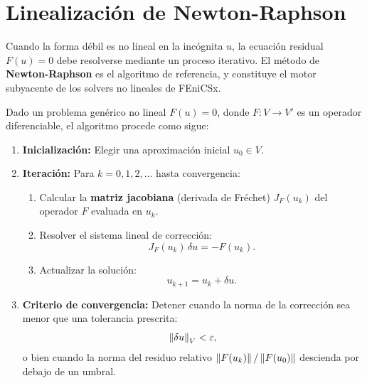 \section{Linealización de Newton-Raphson}
\label{sec:newton-raphson}

Cuando la forma débil es no lineal en la incógnita $u$, la ecuación residual $F(u) = 0$ debe resolverse mediante un proceso iterativo. El método de \textbf{Newton-Raphson} es el algoritmo de referencia, y constituye el motor subyacente de los solvers no lineales de FEniCSx.

Dado un problema genérico no lineal $F(u) = 0$, donde $F: V \to V'$ es un operador diferenciable, el algoritmo procede como sigue:

\begin{enumerate}
    \item \textbf{Inicialización:} Elegir una aproximación inicial $u_0 \in V$.
    \item \textbf{Iteración:} Para $k = 0, 1, 2, \dots$ hasta convergencia:
    \begin{enumerate}
        \item Calcular la \textbf{matriz jacobiana} (derivada de Fréchet) $J_F(u_k)$ del operador $F$ evaluada en $u_k$.
        \item Resolver el sistema lineal de corrección:
        \begin{equation}
            J_F(u_k) \, \delta u = -F(u_k).
            \label{eq:newton-step}
        \end{equation}
        \item Actualizar la solución:
        \begin{equation}
            u_{k+1} = u_k + \delta u.
            \label{eq:newton-update}
        \end{equation}
    \end{enumerate}
    \item \textbf{Criterio de convergencia:} Detener cuando la norma de la corrección sea menor que una tolerancia prescrita:
    \begin{equation}
        \left\lVert\delta u\right\rVert_V < \varepsilon,
        \label{eq:newton-tol}
    \end{equation}
    o bien cuando la norma del residuo relativo $\left\lVert F(u_k)\right\rVert / \left\lVert F(u_0)\right\rVert$ descienda por debajo de un umbral.
\end{enumerate}

